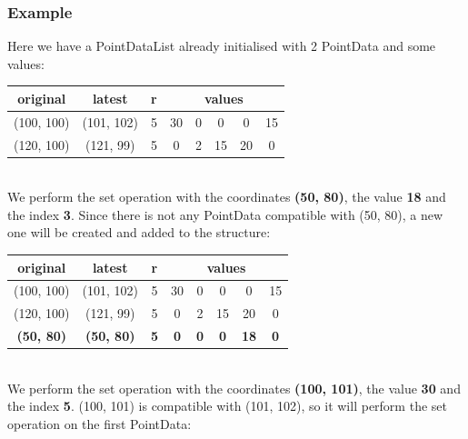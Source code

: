 \documentclass[a4paper,12pt,oneside]{book}
\begin{document}
\begin{onehalfspace}
    	\subsubsection{Example}
    	Here we have a PointDataList already initialised with 2 PointData and some values:
    	\begin{table}[!htbp]
            \centering
            \begin{tabular}{*8c}
            \toprule
           \textbf{original} & \textbf{latest} & \textbf{r} &  \multicolumn{5}{c}{\textbf{values}}\\
            \midrule
            (100, 100) & (101, 102) & 5 & 30 & 0 & 0 & 0 & 15\\
            (120, 100) & (121, 99) & 5  & 0  & 2 & 15 & 20 & 0\\
            \bottomrule
            \end{tabular}
        \end{table} \\
    	We perform the set operation with the coordinates \textbf{(50, 80)}, the value \textbf{18} and the index \textbf{3}. Since there is not any PointData compatible with (50, 80), a new one will be created and added to the structure:
    	\begin{table}[!htbp]
            \centering
            \begin{tabular}{*8c}
            \toprule
           \textbf{original} & \textbf{latest} & \textbf{r} &  \multicolumn{5}{c}{\textbf{values}}\\
            \midrule
            (100, 100) & (101, 102) & 5 & 30 & 0 & 0 & 0 & 15\\
            (120, 100) & (121, 99) & 5  & 0  & 2 & 15 & 20 & 0\\
            \textbf{(50, 80)} & \textbf{(50, 80)} & \textbf{5} & \textbf{0} & \textbf{0} & \textbf{0} & \textbf{18} & \textbf{0}\\
            \bottomrule
            \end{tabular}
        \end{table} \\
    	We perform the set operation with the coordinates \textbf{(100, 101)}, the value \textbf{30} and the index \textbf{5}. (100, 101) is compatible with (101, 102), so it will perform the set operation on the first PointData:
    	\begin{table}[!htbp]
            \centering

\end{table}
\end{onehalfspace}
\end{document}
